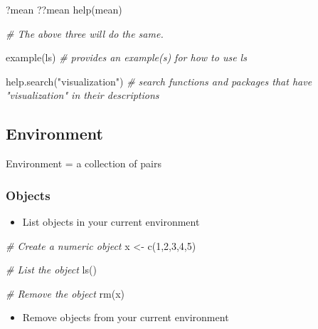 \documentclass[
]{book}
\newenvironment{Shaded}{\begin{snugshade}}{\end{snugshade}}
\newcommand{\CommentTok}[1]{\textcolor[rgb]{0.56,0.35,0.01}{\textit{#1}}}
\newcommand{\DecValTok}[1]{\textcolor[rgb]{0.00,0.00,0.81}{#1}}
\newcommand{\FunctionTok}[1]{\textcolor[rgb]{0.00,0.00,0.00}{#1}}
\newcommand{\NormalTok}[1]{#1}
\newcommand{\OtherTok}[1]{\textcolor[rgb]{0.56,0.35,0.01}{#1}}
\newcommand{\StringTok}[1]{\textcolor[rgb]{0.31,0.60,0.02}{#1}}
\providecommand{\tightlist}{%
  \setlength{\itemsep}{0pt}\setlength{\parskip}{0pt}}
\begin{document}
\begin{Shaded}
\begin{Highlighting}[]
\NormalTok{?mean}
\NormalTok{??mean}
\FunctionTok{help}\NormalTok{(mean)}

\CommentTok{\# The above three will do the same. }

\FunctionTok{example}\NormalTok{(ls) }\CommentTok{\# provides an example(s) for how to use ls }

\FunctionTok{help.search}\NormalTok{(}\StringTok{"visualization"}\NormalTok{) }\CommentTok{\# search functions and packages that have "visualization" in their descriptions}
\end{Highlighting}
\end{Shaded}

\hypertarget{environment}{%
\subsection{Environment}\label{environment}}

Environment = a collection of pairs

\hypertarget{objects}{%
\subsubsection{Objects}\label{objects}}

\begin{itemize}
\tightlist
\item
  List objects in your current environment
\end{itemize}

\begin{Shaded}
\begin{Highlighting}[]
\CommentTok{\# Create a numeric object }
\NormalTok{x }\OtherTok{\textless{}{-}} \FunctionTok{c}\NormalTok{(}\DecValTok{1}\NormalTok{,}\DecValTok{2}\NormalTok{,}\DecValTok{3}\NormalTok{,}\DecValTok{4}\NormalTok{,}\DecValTok{5}\NormalTok{)}

\CommentTok{\# List the object }
\FunctionTok{ls}\NormalTok{()}

\CommentTok{\# Remove the object }
\FunctionTok{rm}\NormalTok{(x)}
\end{Highlighting}
\end{Shaded}

\begin{itemize}
\tightlist
\item
  Remove objects from your current environment
\end{itemize}
\end{document}
